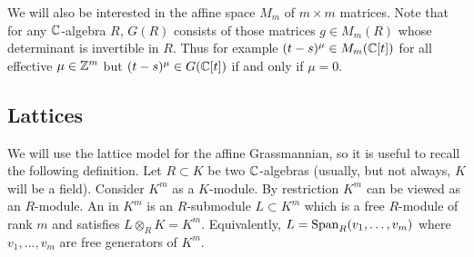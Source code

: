 \documentclass[draft]{article} %
\begin{document}
We will also be interested in the affine space $ M_m$ of $m\times m$ matrices.  Note that for any $ \mathbb C$-algebra $ R $, 
$G(R)$ consists of those matrices $ g \in M_m(R) $ whose determinant is invertible in $ R$. Thus for example $ (t-s)^\mu\in M_m(\mathbb C[t])$ for all effective $ \mu \in \mathbb Z^m$ but 
$(t-s)^\mu\in G(\mathbb C[t])$ if and only if $ \mu = 0 $.
% 


\subsection{Lattices}
\label{ss:lat}
We will use the lattice model for the affine Grassmannian, so it is useful to recall the following definition. Let $ R \subset K$ be two $\mathbb C$-algebras (usually, but not always, $K$ will be a field). 
Consider $ K^m $ as a $K$-module. 
By restriction $ K^m$ can be viewed as an $R$-module.  An  in $K^m$ 
is an $R$-submodule $ L \subset K^m$ 
which is a free $R$-module of rank $ m $ and satisfies $ L \otimes_R K = K^m $. Equivalently, $ L = \operatorname{Span}_R(v_1, \dots, v_m)$ where $v_1, \dots, v_m$ are free generators of $K^m$. 
% 
\begin{comment}
\jcom{Maybe need that both $K$ and $R$ are integral domains and have the same field of fractions?} 
\acom{Roger has proved that what is written is ok.}
\rcom{Here's my argument: If $L \subset K^m$ is a free rank $m$ $R$-module and $L \otimes K = K^m$, then it's clear we that $L$ is generated by $m$ generators $v_1,\dots,v_m$ over $R$. Since $L\otimes K = K^m$, these also generate $K^m$ over $K$. Then we have a surjective map $K^m \twoheadrightarrow K^m$ given by sending a basis of $K^m$ to the generators $v_1,\dots,v_m$. Since any surjective endomorphism of finite $K$-modules is injective, the $v_1,\dots,v_m$ form a basis. I think the only thing that is needed is that the rings are commutative.}
\jcom{Great.}
\end{comment} 
\end{document}
